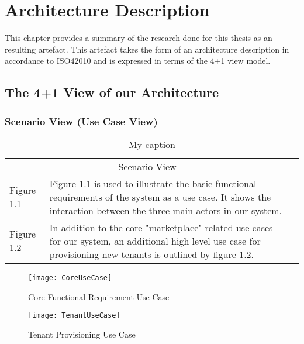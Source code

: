 \chapter{Architecture Description}
\label{chap:ad}
This chapter provides a summary of the research done for this thesis as an resulting artefact. This artefact takes the form of an architecture description in accordance to ISO42010 and is expressed in terms of the 4+1 view model.

\section{The 4+1 View of our Architecture}


\subsection{Scenario View (Use Case View)}

\begin{table}[h]
\centering
\begin{tabularx}{\textwidth}{lXl}
\cline{1-2}
\multicolumn{2}{|c|}{\cellcolor[HTML]{EFEFEF}Scenario View} &  \\ \cline{1-2}
\multicolumn{1}{|l|}{Figure \ref{fig:coreusecase}} & \multicolumn{1}{X|}{Figure \ref{fig:coreusecase} is used to illustrate the basic functional requirements of the system as a use case. It shows the interaction between the three main actors in our system.} &  \\ \cline{1-2}
\multicolumn{1}{|l|}{Figure \ref{fig:tenantusecase}} & \multicolumn{1}{X|}{In addition to the core "marketplace" related use cases for our system, an additional high level use case for provisioning new tenants is outlined by figure \ref{fig:tenantusecase}.} & \\
\cline{1-2}
\end{tabularx}
\caption{My caption}
\label{my-label}
\end{table}




\begin{figure}
\centering
\texttt{[image: CoreUseCase]}
\caption{Core Functional Requirement Use Case}
\label{fig:coreusecase}
\end{figure}


\begin{figure}
\centering
\texttt{[image: TenantUseCase]}
\caption{Tenant Provisioning Use Case}
\label{fig:tenantusecase}
\end{figure}

